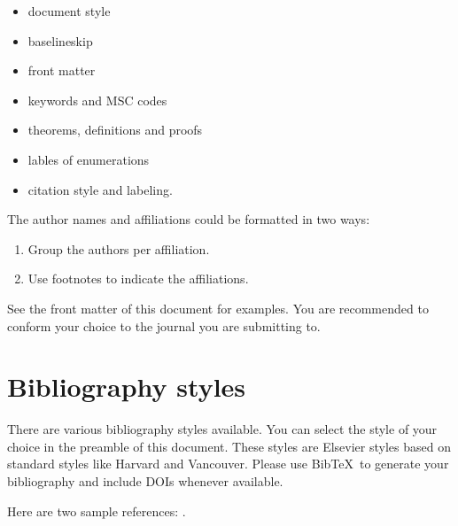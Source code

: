 \documentclass[review]{elsarticle}
\begin{document}
\begin{itemize}
\item document style
\item baselineskip
\item front matter
\item keywords and MSC codes
\item theorems, definitions and proofs
\item lables of enumerations
\item citation style and labeling.
\end{itemize}



The author names and affiliations could be formatted in two ways:
\begin{enumerate}[(1)]
\item Group the authors per affiliation.
\item Use footnotes to indicate the affiliations.
\end{enumerate}
See the front matter of this document for examples. You are recommended to conform your choice to the journal you are submitting to.

\section{Bibliography styles}

There are various bibliography styles available. You can select the style of your choice in the preamble of this document. These styles are Elsevier styles based on standard styles like Harvard and Vancouver. Please use Bib\TeX\ to generate your bibliography and include DOIs whenever available.

Here are two sample references: \cite{Feynman1963118,Dirac1953888}.



\end{document}
